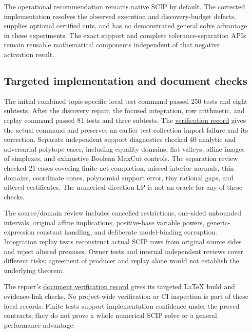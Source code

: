 The operational recommendation remains native SCIP by default. The
corrected implementation resolves the observed execution and discovery-budget
defects, supplies optional certified cuts, and has no demonstrated general
solve advantage in these experiments. The exact support and complete
tolerance-separation APIs remain reusable mathematical components independent
of that negative activation result.

\subsection{Targeted implementation and document checks}

The initial combined topic-specific local test command passed 250 tests and
eight subtests. After the discovery repair, the focused integration, row
arithmetic, and replay command passed 81 tests and three subtests. The
\href{run:../VERIFICATION.md}{verification record}
gives the actual command and preserves an earlier test-collection import
failure and its correction. Separate independent support diagnostics
checked 40 analytic and adversarial polytope cases, including equality
domains, flat valleys, affine images of simplexes, and exhaustive Boolean
MaxCut controls. The separation review checked 21 cases covering finite-net
completion, missed interior normals, thin domains, coordinate cones,
polynomial support error, tiny rational gaps, and altered certificates.
The numerical direction LP is not an oracle for any of these checks.

The source/domain review includes cancelled restrictions, one-sided
unbounded intervals, original affine implications, positive-base variable
powers, generic-expression constant handling, and deliberate model-binding
corruption. Integration replay tests reconstruct actual SCIP rows from
original source sides and reject altered premises. Owner tests and internal
independent reviews cover different risks; agreement of producer and replay
alone would not establish the underlying theorem.

The report's \href{run:VERIFICATION.md}{document verification record}
gives its targeted LaTeX build and evidence-link checks. No project-wide
verification or CI inspection is part of these local records. Finite tests
support implementation confidence under the proved contracts; they do not
prove a whole numerical SCIP solve or a general performance advantage.
